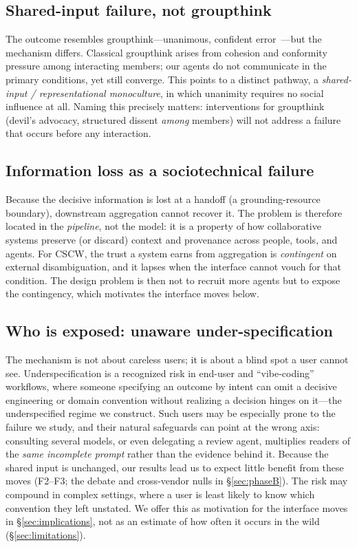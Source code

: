 \documentclass[acmsmall,screen,review,anonymous]{acmart}
\begin{document}
\subsection{Shared-input failure, not groupthink}
The outcome resembles groupthink---unanimous, confident error~\cite{janis1972}---but the mechanism differs.
Classical groupthink arises from cohesion and conformity pressure among interacting members; our agents do
not communicate in the primary conditions, yet still converge. This points to a
distinct pathway, a \emph{shared-input / representational monoculture}, in which unanimity requires no
social influence at all. Naming this precisely matters: interventions for groupthink (devil's advocacy,
structured dissent \emph{among} members) will not address a failure that occurs before any interaction.

\subsection{Information loss as a sociotechnical failure}
Because the decisive information is lost at a handoff (a grounding-resource boundary), downstream
aggregation cannot recover it. The problem is therefore located in the \emph{pipeline}, not the model: it is
a property of how collaborative systems preserve (or discard) context and provenance across people, tools,
and agents. For CSCW, the trust a system earns from aggregation is \emph{contingent} on external
disambiguation, and it lapses when the interface cannot vouch for that condition. The design problem is then
not to recruit more agents but to expose the contingency, which motivates the interface moves below.

\subsection{Who is exposed: unaware under-specification}
The mechanism is not about careless users; it is about a blind spot a user cannot see. Underspecification is
a recognized risk in end-user and ``vibe-coding'' workflows, where someone specifying an outcome by intent can
omit a decisive engineering or domain convention without realizing a decision hinges on it---the underspecified
regime we construct. Such users may be
especially prone to the failure we study, and their natural safeguards can point at the wrong axis: consulting
several models, or even delegating a review agent, multiplies readers of the \emph{same incomplete prompt}
rather than the evidence behind it. Because the shared input is unchanged, our results lead us to expect
little benefit from these moves (F2--F3; the debate and cross-vendor nulls in \S\ref{sec:phaseB}). The risk may compound in complex settings, where a user is least likely to
know which convention they left unstated. We offer this as motivation for the interface moves in
\S\ref{sec:implications}, not as an estimate of how often it occurs in the wild (\S\ref{sec:limitations}).
\end{document}
